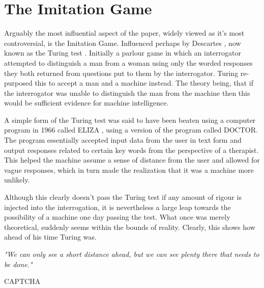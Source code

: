 \documentclass{scrartcl}
\begin{document}
\section{The Imitation Game}

Arguably the most influential aspect of the paper, widely viewed as it's most controversial, is the Imitation Game. Influenced perhaps by Descartes \cite{descartes1996discourse:6}, now known as the Turing test \cite{suchman1987plans:7}. Initially a parlour game in which an interrogator attempted to distinguish a man from a woman using only the worded responses they both returned from questions put to them by the interrogator. Turing re-purposed this to accept a man and a machine instead. The theory being, that if the interrogator was unable to distinguish the man from the machine then this would be sufficient evidence for machine intelligence. \par
A simple form of the Turing test was said to have been beaten using a computer program in 1966 called ELIZA \cite{weizenbaum1966eliza:8}, using a version of the program called DOCTOR. The program essentially accepted input data from the user in text form and output responses related to certain key words from the perspective of a therapist. This helped the machine assume a sense of distance from the user and allowed for vague responses, which in turn made the realization that it was a machine more unlikely. \par
Although this clearly doesn't pass the Turing test if any amount of rigour is injected into the interrogation, it is nevertheless a large leap towards the possibility of a machine one day passing the test. What once was merely theoretical, suddenly seems within the bounds of reality. Clearly, this shows how ahead of his time Turing was.\par 
\textit{"We can only see a short distance ahead, but we can see plenty there that needs to be done."}





CAPTCHA






\end{document}
